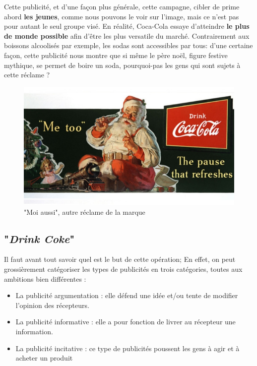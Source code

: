 Cette publicité, et d'une façon plus générale, cette campagne, cibler de prime abord \textbf{les jeunes}, comme nous pouvons le voir sur l'image, mais ce n'est pas pour autant le seul groupe visé. En réalité, Coca-Cola essaye d'atteindre \textbf{le plus de monde possible} afin d'être les plus versatile du marché. Contrairement aux boissons alcoolisés par exemple, les sodas sont accessibles par tous: d'une certaine façon, cette publicité nous montre que si même le père noël, figure festive mythique, se permet de boire un soda, pourquoi-pas les gens qui sont sujets à cette réclame ?

\hfill \break

\begin{figure}[th]
\centering
\includegraphics[width=140mm]{medias/meetoo}
\decoRule
\caption{"Moi aussi", autre réclame de la marque}
\end{figure}
\newpage

\subsection{"\textit{Drink Coke}"}

Il faut avant tout savoir quel est le but de cette opération; En effet, on peut grossièrement catégoriser les types de publicités en trois catégories, toutes aux ambitions bien différentes :

\renewcommand{\labelitemi}{$\ast$}
\begin{itemize}
\item La publicité argumentation : elle défend une idée et/ou tente de modifier l’opinion des récepteurs.
\item La publicité informative : elle a pour fonction de livrer au récepteur une information.
\item La publicité incitative : ce type de publicités poussent les gens à agir et à acheter un produit
\end{itemize}

